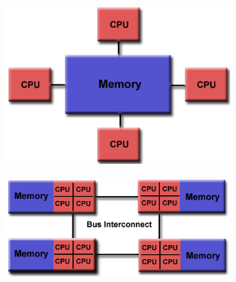 \begin{description}
\begin{description}
\begin{itemize}
\begin{figure}[b]
\begin{subfigure}[b]{0.5\textwidth}
				\centering
				\includegraphics[width=0.92\textwidth]{./images/parallel_programming/shared_mem}
				\caption[]{}%
			\end{subfigure}%
			\begin{subfigure}[b]{0.5\textwidth}
				\centering
				\includegraphics[width=0.92\textwidth]{./images/parallel_programming/numa}
				\caption[]{}%
			\end{subfigure}%


\end{figure}
\end{itemize}
\end{description}
\end{description}
